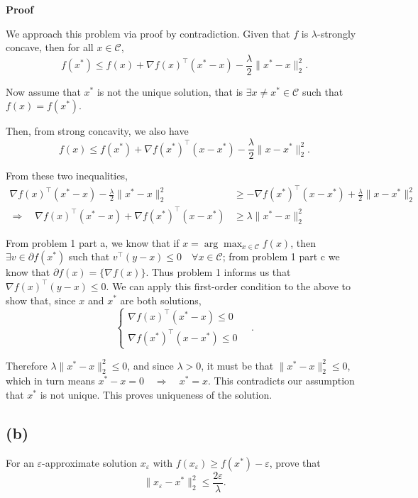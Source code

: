 \documentclass[11pt]{article}
\begin{document}
\hrulefill

\textbf{Proof}

We approach this problem via proof by contradiction. Given that $f$ is $\lambda$-strongly concave, then for all $x \in \mathcal{C}$,
\[
f(x^*) \leq f(x) + \nabla f(x)^\top (x^* - x) - \frac{\lambda}{2}\|x^* - x\|_2^2.
\]

Now assume that $x^*$ is not the unique solution, that is $\exists x \neq x^* \in \mathcal{C}$ such that $f(x) = f(x^*)$.

Then, from strong concavity, we also have
\[
f(x) \leq f(x^*) + \nabla f(x^*)^\top (x - x^*) - \frac{\lambda}{2}\|x - x^*\|_2^2.
\]

From these two inequalities,
\begin{align*}
    \nabla f(x)^\top (x^* - x) - \frac{\lambda}{2}\|x^* - x\|_2^2 &\geq  - \nabla f(x^*)^\top (x - x^*) + \frac{\lambda}{2}\|x - x^*\|_2^2 \\
    \Rightarrow \quad \nabla f(x)^\top (x^* - x) + \nabla f(x^*)^\top (x - x^*) &\geq \lambda\|x^* - x\|_2^2
\end{align*}

From problem 1 part a, we know that if $x = \arg \max_{x \in \mathcal{C}} f(x)$, then $\exists v \in \partial f(x^*)$ such that $v^\top (y - x) \leq 0 \quad \forall x \in \mathcal{C}$; from problem 1 part c we know that $\partial f(x) = \{\nabla f(x)\}$. Thus problem 1 informs us that $\nabla f(x)^\top (y - x) \leq 0$. We can apply this first-order condition to the above to show that, since $x$ and $x^*$ are both solutions,
\[
\begin{cases}
    \nabla f(x)^\top (x^* - x) \leq 0 \\
    \nabla f(x^*)^\top (x - x^*) \leq 0
\end{cases} \quad.
\]

Therefore $\lambda\|x^* - x\|_2^2 \leq 0$, and since $\lambda > 0$, it must be that $\|x^* - x\|_2^2 \leq 0$, which in turn means $x^* - x = 0 \quad \Rightarrow \quad x^* = x$. This contradicts our assumption that $x^*$ is not unique. This proves uniqueness of the solution.

\hrulefill

\subsection*{(b)}

For an $\varepsilon$-approximate solution $x_\varepsilon$ with
$f(x_\varepsilon) \ge f(x^*) - \varepsilon$, prove that
\[
\|x_\varepsilon - x^*\|_2^2 \le \frac{2\varepsilon}{\lambda}.
\]
\end{document}
